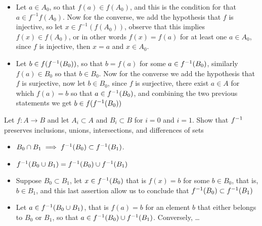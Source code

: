 \begin{sol}
	
	\begin{itemize}
		\item Let $ a \in A_0 $, so that $ f(a) \in f(A_0) $, and this is the condition for that $ a \in f^{-1}f(A_0) $. Now for the converse, we add the hypothesis that $ f $ is injective, so let $ x \in f^{-1}(f(A_0)) $, observe that this implies $ f(x) \in f(A_0) $, or in other words $ f(x) = f(a)  $ for at least one $ a \in A_0 $, since $ f $ is injective, then $ x = a $ and $ x \in A_0 $.
		
		\item Let $ b \in f(f^{-1} (B_0))$, so that $ b = f(a) $ for some $ a \in f^{-1} (B_0) $, similarly $ f(a) \in B_0 $ so that $ b \in B_0 $. Now for the converse we add the hypothesis that $ f $ is surjective, now let $ b \in B_0 $, since $ f $ is surjective, there exist $ a \in A $ for which $ f(a) = b $ so that $ a \in f^{-1}(B_0) $, and combining the two previous statements we get $ b \in f(f^{-1}(B_0))  $
	\end{itemize}

\end{sol}

\begin{exc}
	Let $ f: A \rightarrow B $ and let $ A_i \subset A $ and $ B_i \subset B $ for $ i = 0 $ and $ i =1 $. Show that $ f^{-1} $ preserves inclusions, unions, intersections, and differences of sets
	\begin{itemize}
		\item $ B_0 \cap B_1 \implies f^{-1}(B_0) \subset f^{-1}(B_1) $.
		\item $ f^{-1}(B_0 \cup B_1) = f^{-1}(B_0) \cup f^{-1}(B_1) $
	\end{itemize}
\end{exc}

\begin{sol}
	\begin{itemize}
		\item Suppose $ B_0 \subset B_1 $, let $ x \in f^{-1}(B_0) $ that is $ f(x) = b $ for some $ b \in B_0 $, that is, $ b \in B_1 $, and this last assertion allow us to conclude that $ f^{-1}(B_0) \subset f^{-1}(B_1) $
		\item Let $ a \in f^{-1}(B_0 \cup B_1) $, that is $ f(a) = b $ for an element $ b $ that either belongs to $ B_0 $ or $ B_1 $, so that $ a \in f^{-1}(B_0) \cup f^{-1}(B_1) $. Conversely, \ldots
	\end{itemize}	
\end{sol}

